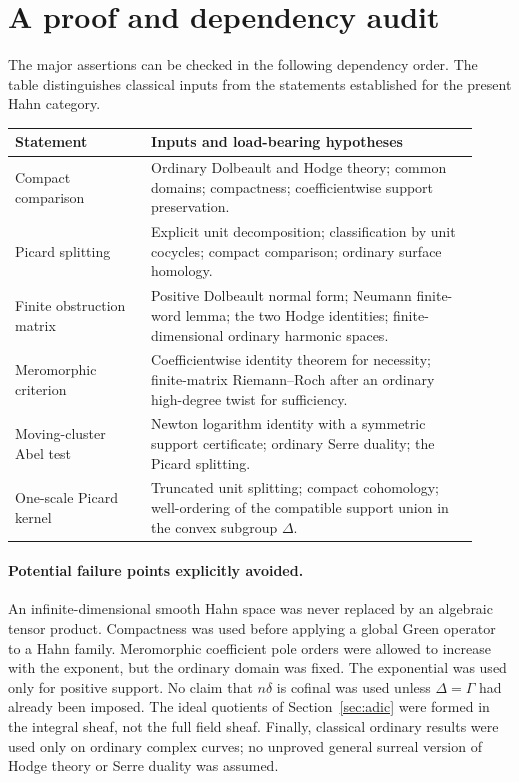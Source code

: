 \documentclass[11pt,letterpaper]{article}
\numberwithin{equation}{section}
\theoremstyle{definition}
\theoremstyle{remark}
\begin{document}
\appendix
\section{A proof and dependency audit}
\label{app:audit}

The major assertions can be checked in the following dependency order.
The table distinguishes classical inputs from the statements established
for the present Hahn category.

\begin{center}
\small
\begin{tabular}{@{}p{0.27\linewidth}p{0.65\linewidth}@{}}
\toprule
Statement & Inputs and load-bearing hypotheses\\
\midrule
Compact comparison & Ordinary Dolbeault and Hodge theory; common domains;
compactness; coefficientwise support preservation.\\[3pt]
Picard splitting & Explicit unit decomposition; classification by
unit cocycles; compact comparison; ordinary surface homology.\\[3pt]
Finite obstruction matrix & Positive Dolbeault normal form;
Neumann finite-word lemma; the two Hodge identities; finite-dimensional
ordinary harmonic spaces.\\[3pt]
Meromorphic criterion & Coefficientwise identity theorem for necessity;
finite-matrix Riemann--Roch after an ordinary high-degree twist for
sufficiency.\\[3pt]
Moving-cluster Abel test & Newton logarithm identity with a symmetric
support certificate; ordinary Serre duality; the Picard splitting.\\[3pt]
One-scale Picard kernel & Truncated unit splitting; compact cohomology;
well-ordering of the compatible support union in the convex subgroup
$\Delta$.\\
\bottomrule
\end{tabular}
\end{center}

\paragraph{Potential failure points explicitly avoided.}
An infinite-dimensional smooth Hahn space was never replaced by an
algebraic tensor product. Compactness was used before applying a global
Green operator to a Hahn family. Meromorphic coefficient pole orders
were allowed to increase with the exponent, but the ordinary domain
was fixed. The exponential was used only for positive support. No
claim that $n\delta$ is cofinal was used unless $\Delta=\Gamma$ had
already been imposed. The ideal quotients of Section~\ref{sec:adic}
were formed in the integral sheaf, not the full field sheaf. Finally,
classical ordinary results were used only on ordinary complex curves;
no unproved general surreal version of Hodge theory or Serre duality
was assumed.
\end{document}

